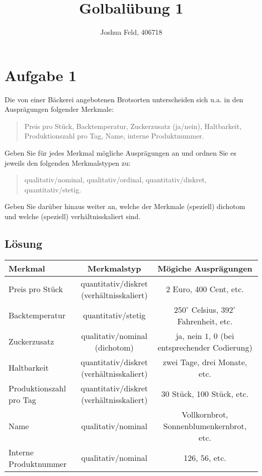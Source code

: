 \documentclass{exercise}
\institute{Institut für Statistik und Wirtschaftsmathematik}
\title{Golbalübung 1}
\author{Joshua Feld, 406718}
\begin{document}
    \maketitle


    \section*{Aufgabe 1}

    \begin{problem}
        Die von einer Bäckerei angebotenen Brotsorten unterscheiden sich u.a. in den Ausprägungen folgender Merkmale:
        \begin{quote}
            Preis pro Stück, Backtemperatur, Zuckerzusatz (ja/nein), Haltbarkeit, Produktionszahl pro Tag, Name, interne Produktnummer.
        \end{quote}
        Geben Sie für jedes Merkmal mögliche Ausprägungen an und ordnen Sie es jeweils den folgenden Merkmalstypen zu:
        \begin{quote}
            qualitativ/nominal, qualitativ/ordinal, quantitativ/diskret, quantitativ/stetig.
        \end{quote}
        Geben Sie darüber hinaus weiter an, welche der Merkmale (speziell) dichotom und welche (speziell) verhältnisskaliert sind.
    \end{problem}

    \subsection*{Lösung}
    \begin{center}
        \begin{tabular}{lcc}
            \toprule
            Merkmal & Merkmalstyp & Mögiche Ausprägungen\\
            \midrule
            Preis pro Stück & \makecell{quantitativ/diskret\\(verhältnisskaliert)} & 2 Euro, 400 Cent, etc.\\
            Backtemperatur & quantitativ/stetig & \(250^\circ\) Celsius, \(392^\circ\) Fahrenheit, etc.\\
            Zuckerzusatz & \makecell{qualitativ/nominal\\(dichotom)} & \makecell{ja, nein\\\(1\), \(0\) (bei entsprechender Codierung)}\\
            Haltbarkeit & \makecell{quantitativ/diskret\\(verhältnisskaliert)} & zwei Tage, drei Monate, etc.\\
            Produktionszahl pro Tag & \makecell{quantitativ/diskret\\(verhältnisskaliert)} & 30 Stück, 100 Stück, etc.\\
            Name & qualitativ/nominal & Vollkornbrot, Sonnenblumenkernbrot, etc.\\
            Interne Produktnummer & qualitativ/nominal & 126, 56, etc.\\
            \bottomrule
        \end{tabular}
    \end{center}
\end{document}
